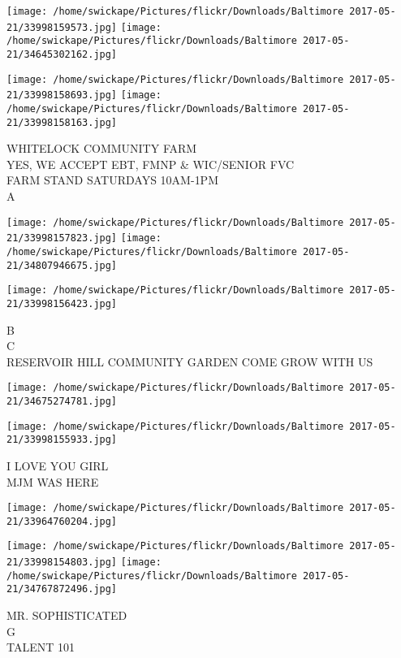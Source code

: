 \documentclass[10pt,letterpaper]{article}
\begin{document}
\texttt{[image: /home/swickape/Pictures/flickr/Downloads/Baltimore 2017-05-21/33998159573.jpg]}
\texttt{[image: /home/swickape/Pictures/flickr/Downloads/Baltimore 2017-05-21/34645302162.jpg]}

\texttt{[image: /home/swickape/Pictures/flickr/Downloads/Baltimore 2017-05-21/33998158693.jpg]}
\texttt{[image: /home/swickape/Pictures/flickr/Downloads/Baltimore 2017-05-21/33998158163.jpg]}

WHITELOCK COMMUNITY FARM\\
YES, WE ACCEPT EBT, FMNP \& WIC/SENIOR FVC\\
FARM STAND SATURDAYS 10AM{-}1PM\\
A\\
\pagebreak

\texttt{[image: /home/swickape/Pictures/flickr/Downloads/Baltimore 2017-05-21/33998157823.jpg]}
\texttt{[image: /home/swickape/Pictures/flickr/Downloads/Baltimore 2017-05-21/34807946675.jpg]}

\texttt{[image: /home/swickape/Pictures/flickr/Downloads/Baltimore 2017-05-21/33998156423.jpg]}

B\\
C\\
RESERVOIR HILL COMMUNITY GARDEN COME GROW WITH US\\
\pagebreak

\texttt{[image: /home/swickape/Pictures/flickr/Downloads/Baltimore 2017-05-21/34675274781.jpg]}

\vspace{0.25in}
\texttt{[image: /home/swickape/Pictures/flickr/Downloads/Baltimore 2017-05-21/33998155933.jpg]}

I LOVE YOU GIRL\\
MJM WAS HERE\\
\pagebreak

\texttt{[image: /home/swickape/Pictures/flickr/Downloads/Baltimore 2017-05-21/33964760204.jpg]}

\vspace{0.25in}
\texttt{[image: /home/swickape/Pictures/flickr/Downloads/Baltimore 2017-05-21/33998154803.jpg]}
\texttt{[image: /home/swickape/Pictures/flickr/Downloads/Baltimore 2017-05-21/34767872496.jpg]}

MR. SOPHISTICATED\\
G\\
TALENT 101\\
\pagebreak
\end{document}

